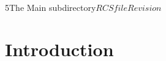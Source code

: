 %   

\begin{cactuspart}{5}{The Main subdirectory}{$RCSfile$}{$Revision$}
\renewcommand{\thepage}{\Alph{part}\arabic{page}}

\chapter{Introduction}


\end{cactuspart}
